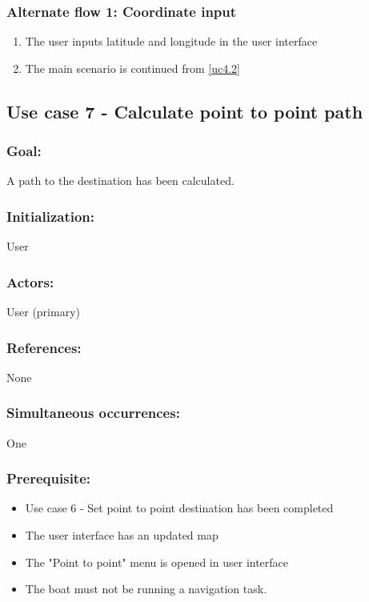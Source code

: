 \begin{framed}
	\subsubsection*{Alternate flow 1: Coordinate input}
		\begin{enumerate}
			\item The user inputs latitude and longitude in the user interface
			\item The main scenario is continued from \ref{uc4.2}
		\end{enumerate}
\end{framed}	

\begin{framed}
	\subsection{Use case 7 - Calculate point to point path}
	\subsubsection*{Goal:}
	A path to the destination has been calculated.
	
	\subsubsection*{Initialization:}
	User
	
	\subsubsection*{Actors:}
	User (primary)
	
	\subsubsection*{References:}
	None
	
	\subsubsection*{Simultaneous occurrences:}
	One 
	
	\subsubsection*{Prerequisite:}
	\begin{itemize}
		\item Use case 6 - Set point to point destination has been completed
		\item The user interface has an updated map
		\item The "Point to point" menu is opened in user interface
		\item The boat must not be running a navigation task.
	\end{itemize}
	

\end{framed}
